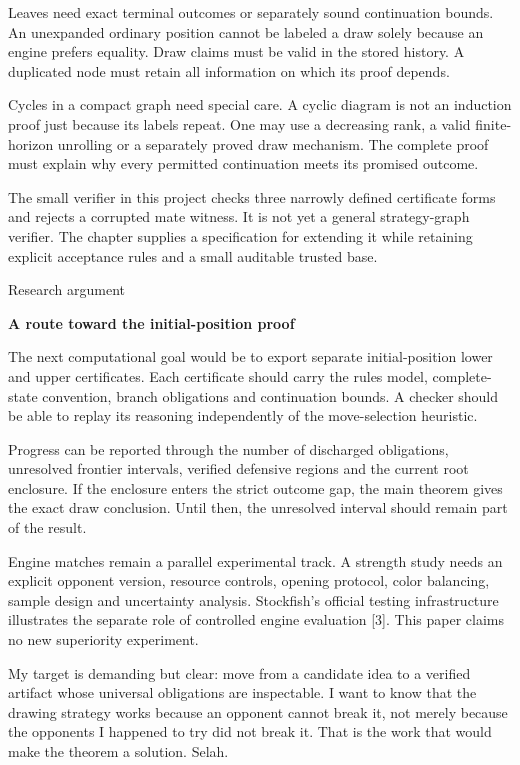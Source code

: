 \documentclass[10pt]{article}
\begin{document}
Leaves need exact terminal outcomes or separately sound continuation bounds. An unexpanded ordinary position cannot be labeled a draw solely because an engine prefers equality. Draw claims must be valid in the stored history. A duplicated node must retain all information on which its proof depends.\par
Cycles in a compact graph need special care. A cyclic diagram is not an induction proof just because its labels repeat. One may use a decreasing rank, a valid finite-horizon unrolling or a separately proved draw mechanism. The complete proof must explain why every permitted continuation meets its promised outcome.\par
The small verifier in this project checks three narrowly defined certificate forms and rejects a corrupted mate witness. It is not yet a general strategy-graph verifier. The chapter supplies a specification for extending it while retaining explicit acceptance rules and a small auditable trusted base.\par
\clearpage
{\small\color{accent}Research argument}\par
{\LARGE\bfseries\color{ink}A route toward the initial-position proof}\par\vspace{7pt}
The next computational goal would be to export separate initial-position lower and upper certificates. Each certificate should carry the rules model, complete-state convention, branch obligations and continuation bounds. A checker should be able to replay its reasoning independently of the move-selection heuristic.\par
Progress can be reported through the number of discharged obligations, unresolved frontier intervals, verified defensive regions and the current root enclosure. If the enclosure enters the strict outcome gap, the main theorem gives the exact draw conclusion. Until then, the unresolved interval should remain part of the result.\par
Engine matches remain a parallel experimental track. A strength study needs an explicit opponent version, resource controls, opening protocol, color balancing, sample design and uncertainty analysis. Stockfish's official testing infrastructure illustrates the separate role of controlled engine evaluation [3]. This paper claims no new superiority experiment.\par
My target is demanding but clear: move from a candidate idea to a verified artifact whose universal obligations are inspectable. I want to know that the drawing strategy works because an opponent cannot break it, not merely because the opponents I happened to try did not break it. That is the work that would make the theorem a solution. Selah.\par
\end{document}
